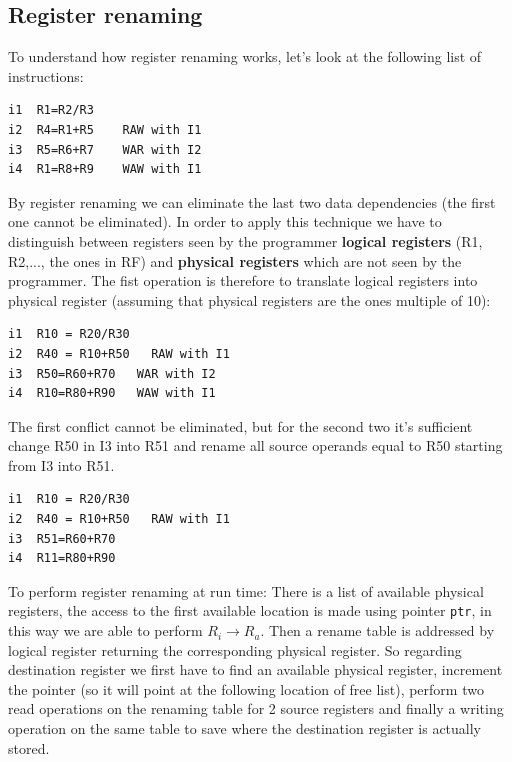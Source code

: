 
\subsection{Register renaming}
To understand how register renaming works, let's look at the following list of instructions:
\begin{verbatim}
i1  R1=R2/R3
i2  R4=R1+R5    RAW with I1
i3  R5=R6+R7    WAR with I2
i4  R1=R8+R9    WAW with I1
\end{verbatim}

By register renaming we can eliminate the last two data dependencies (the first one cannot be eliminated). In order to apply this technique we have to distinguish between registers seen by the programmer \textbf{logical registers} (R1, R2,..., the ones in RF) and \textbf{physical registers} which are not seen by the programmer. The fist operation is therefore to translate logical registers into physical register (assuming that physical registers are the ones multiple of 10):

\begin{verbatim}
i1  R10 = R20/R30
i2  R40 = R10+R50   RAW with I1
i3  R50=R60+R70   WAR with I2
i4  R10=R80+R90   WAW with I1
\end{verbatim}

The first conflict cannot be eliminated, but for the second two it's sufficient change R50 in I3 into R51 and rename all source operands equal to R50 starting from I3 into R51.

\begin{verbatim}
i1  R10 = R20/R30
i2  R40 = R10+R50   RAW with I1
i3  R51=R60+R70
i4  R11=R80+R90
\end{verbatim}

To perform register renaming at run time:
There is a list of available physical registers, the access to the first available location is made using pointer \verb|ptr|, in this way we are able to perform $R_i \rightarrow R_a$.
Then a rename table is addressed by logical register returning the corresponding physical register. So regarding destination register we first have to find an available physical register, increment the pointer (so it will point at the following location of free list), perform two read operations on the renaming table for 2 source registers and finally a writing operation on the same table to save where the destination register is actually stored.


